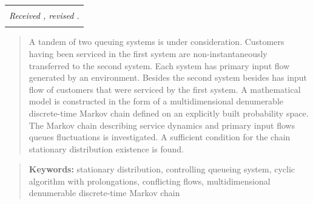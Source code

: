 \documentclass[a4paper,twoside]{article}
\theoremstyle{theorem}
\theoremstyle{remark}
\begin{document}
\begin{center}
\renewcommand{\arraystretch}{0}
\begin{tabular}{c}
\hline
\rule{0pt}{2mm}\\
\small\it
Received ,
revised .
\\
\rule{0pt}{2mm}\\
\hline
\end{tabular}
\end{center}

\begin{quote}
 A tandem of two queuing systems is under consideration. Customers having been serviced in the first system  are non-instantaneously  transferred to the second system. Each system has primary input flow generated by an environment. Besides the second system besides has input flow of customers that were serviced by the first system. A mathematical model is constructed in the form of a multidimensional denumerable discrete-time Markov chain defined on an explicitly built probability space. The Markov chain describing service dynamics and primary input flows queues fluctuations is investigated. A sufficient condition for the chain stationary distribution existence is found.
\end{quote}
\begin{quote}
{\bf Keywords:} stationary distribution, controlling queueing system, cyclic algorithm with prolongations, conflicting flows, multidimensional denumerable discrete-time Markov chain
\end{quote}
\vspace{5mm}
\end{document}
